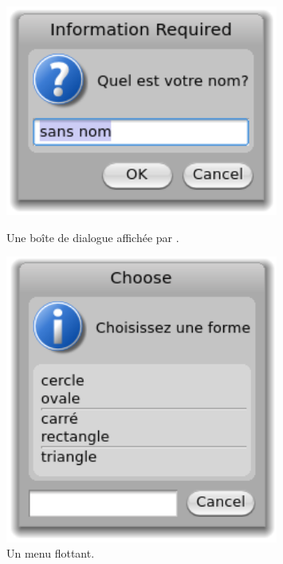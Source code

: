 \documentclass[a4paper,10pt,twoside]{book}
\begin{document}
\begin{figure}[htb]
\begin{minipage}{0.48\textwidth}
	\centerline{\includegraphics[width=0.8\textwidth]{dialog}}
	\caption{Une boîte de dialogue affichée par
      .
		}
\end{minipage}
\hfill
\begin{minipage}{0.48\textwidth}
	\vfill
	\centerline{\includegraphics[width=0.8\textwidth]{popup}}
	\vfill
	\vspace{4ex}
	\caption{Un menu flottant.}
\end{minipage}
\end{figure}
\end{document}
